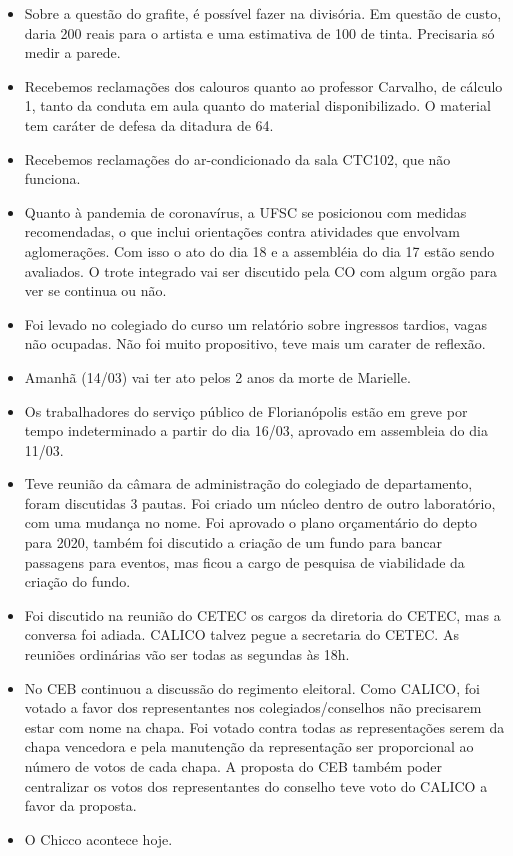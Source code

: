 \documentclass{ata-calico}
\begin{document}
\maketitle

\begin{itemize}
\item Sobre a questão do grafite, é possível fazer na divisória. Em questão de custo, daria 200 reais para o artista e uma estimativa de 100 de tinta. Precisaria só medir a parede.
\item Recebemos reclamações dos calouros quanto ao professor Carvalho, de cálculo 1, tanto da conduta em aula quanto do material disponibilizado. O material tem caráter de defesa da ditadura de 64.
\item Recebemos reclamações do ar-condicionado da sala CTC102, que não funciona.
\item Quanto à pandemia de coronavírus, a UFSC se posicionou com medidas recomendadas, o que inclui orientações contra atividades que envolvam aglomerações. Com isso o ato do dia 18 e a assembléia do dia 17 estão sendo avaliados. O trote integrado vai ser discutido pela CO com algum orgão para ver se continua ou não.
\item Foi levado no colegiado do curso um relatório sobre ingressos tardios, vagas não ocupadas. Não foi muito propositivo, teve mais um carater de reflexão.
\item Amanhã (14/03) vai ter ato pelos 2 anos da morte de Marielle.
\item Os trabalhadores do serviço público de Florianópolis estão em greve por tempo indeterminado a partir do dia 16/03, aprovado em assembleia do dia 11/03.
\item Teve reunião da câmara de administração do colegiado de departamento, foram discutidas 3 pautas. Foi criado um núcleo dentro de outro laboratório, com uma mudança no nome. Foi aprovado o plano orçamentário do depto para 2020, também foi discutido a criação de um fundo para bancar passagens para eventos, mas ficou a cargo de pesquisa de viabilidade da criação do fundo.
\item Foi discutido na reunião do CETEC os cargos da diretoria do CETEC, mas a conversa foi adiada. CALICO talvez pegue a secretaria do CETEC. As reuniões ordinárias vão ser todas as segundas às 18h.
\item No CEB continuou a discussão do regimento eleitoral. Como CALICO, foi votado a favor dos representantes nos colegiados/conselhos não precisarem estar com nome na chapa. Foi votado contra todas as representações serem da chapa vencedora e pela manutenção da representação ser proporcional ao número de votos de cada chapa. A proposta do CEB também poder centralizar os votos dos representantes do conselho teve voto do CALICO a favor da proposta.
\item O Chicco acontece hoje. 
\end{itemize}
\end{document}
